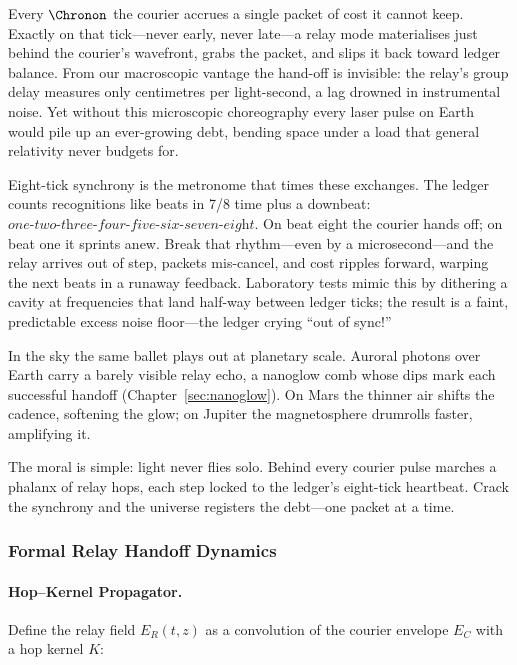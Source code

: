 \documentclass[11pt,oneside]{book}
\begin{document}
{Every \(\Chronon\) the courier accrues a single packet of cost it
cannot keep.  
Exactly on that tick—never early, never late—a relay mode materialises
just behind the courier’s wavefront, grabs the packet, and slips it
back toward ledger balance.  
From our macroscopic vantage the hand-off is invisible: the relay’s
group delay measures only centimetres per light-second, a lag drowned
in instrumental noise.  Yet without this microscopic choreography
every laser pulse on Earth would pile up an ever-growing debt, bending
space under a load that general relativity never budgets for.

Eight-tick synchrony is the metronome that times these exchanges.
The ledger counts recognitions like beats in 7/8 time plus a downbeat:
\(\textit{one-two-three-four-five-six-seven-eight}\).  
On beat eight the courier hands off; on beat one it sprints anew.
Break that rhythm—even by a microsecond—and the relay arrives out of
step, packets mis-cancel, and cost ripples forward, warping the next
beats in a runaway feedback.  
Laboratory tests mimic this by dithering a cavity at frequencies that
land half-way between ledger ticks; the result is a faint,
predictable excess noise floor—the ledger crying “out of sync!”

In the sky the same ballet plays out at planetary scale.  
Auroral photons over Earth carry a barely visible relay echo, a
nanoglow comb whose dips mark each successful handoff
(Chapter~\ref{sec:nanoglow}).  
On Mars the thinner air shifts the cadence, softening the glow; on
Jupiter the magnetosphere drumrolls faster, amplifying it.  

The moral is simple: light never flies solo.  
Behind every courier pulse marches a phalanx of relay hops, each step
locked to the ledger’s eight-tick heartbeat.  
Crack the synchrony and the universe registers the debt—one packet at
a time.


\subsubsection*{Formal Relay Handoff Dynamics}

\paragraph{Hop–Kernel Propagator.}
Define the relay field \(E_{R}(t,z)\) as a convolution of the courier
envelope \(E_{C}\) with a hop kernel \(K\):

}
\end{document}

